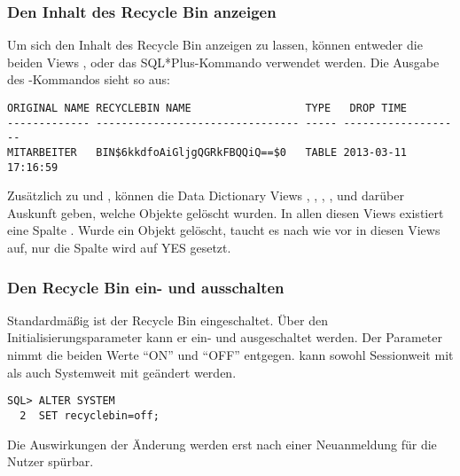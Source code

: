         \subsubsection{Den Inhalt des Recycle Bin anzeigen}
          Um sich den Inhalt des Recycle Bin anzeigen zu lassen, können entweder die beiden Views ,  oder das SQL*Plus-Kommando  verwendet werden. Die Ausgabe des -Kommandos sieht so aus:
          \begin{lstlisting}[caption={\languagesqlplus{show recyclebin}},label=admin1721,language=oracle_sql,emph={[9]RECYCLEBIN,TYPE,TIME,DROP,TABLE},emphstyle={[9]\color{black}}]
ORIGINAL NAME RECYCLEBIN NAME                  TYPE   DROP TIME
------------- -------------------------------- ----- -------------------
MITARBEITER   BIN$6kkdfoAiGljgQGRkFBQQiQ==$0   TABLE 2013-03-11 17:16:59
          \end{lstlisting}
          Zusätzlich zu  und , können die Data Dictionary Views , , , ,  und  darüber Auskunft geben, welche Objekte gelöscht wurden. In allen diesen Views existiert eine Spalte . Wurde ein Objekt gelöscht, taucht es nach wie vor in diesen Views auf, nur die Spalte  wird auf YES gesetzt.
\clearpage
        \subsubsection{Den Recycle Bin ein- und ausschalten}
          Standardmäßig ist der Recycle Bin eingeschaltet. Über den Initialisierungsparameter  kann er ein- und ausgeschaltet werden. Der Parameter nimmt die beiden Werte \enquote{ON} und \enquote{OFF} entgegen.  kann sowohl Sessionweit mit  als auch Systemweit mit  geändert werden.
          \begin{lstlisting}[caption={\languageorasql{Den Recycle Bin ausschalten}},label=admin1722,language=oracle_sql]
SQL> ALTER SYSTEM
  2  SET recyclebin=off;
          \end{lstlisting}
          Die Auswirkungen der Änderung werden erst nach einer Neuanmeldung für die Nutzer spürbar.
